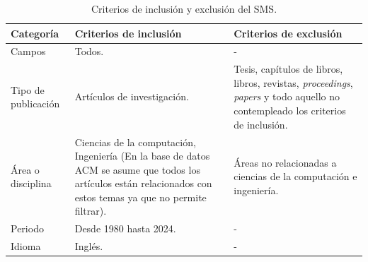 \begin{table}[htbp]
	\centering
	\caption{Criterios de inclusión y exclusión del SMS.}
	\label{table:Criteria}
	\renewcommand{\arraystretch}{1}  %
	\begin{tabular}{p{2.7cm}p{7cm}p{7cm}}
		\toprule
		\textbf{Categoría}  & \textbf{Criterios de inclusión}                                                                                                                                 & \textbf{Criterios de exclusión}                                                                                                                \\
		\midrule
		Campos              & Todos.                                                                                                                                                          & -                                                                                                                                              \\
		\addlinespace[0.8em]
		Tipo de publicación & Artículos de investigación.                                                                                                                                     & Tesis, capítulos de libros, libros, revistas, \textit{proceedings}, \textit{papers} y todo aquello no contempleado los criterios de inclusión. \\
		\addlinespace[0.8em]
		Área o disciplina   & Ciencias de la computación, Ingeniería (En la base de datos ACM se asume que todos los artículos están relacionados con estos temas ya que no permite filtrar). & Áreas no relacionadas a ciencias de la computación e ingeniería.                                                                               \\
		\addlinespace[0.8em]
		Periodo             & Desde 1980 hasta 2024.                                                                                                                                          & -                                                                                                                                              \\
		\addlinespace[0.8em]
		Idioma              & Inglés.                                                                                                                                                         & -                                                                                                                                              \\
		\bottomrule
	\end{tabular}
\end{table}

